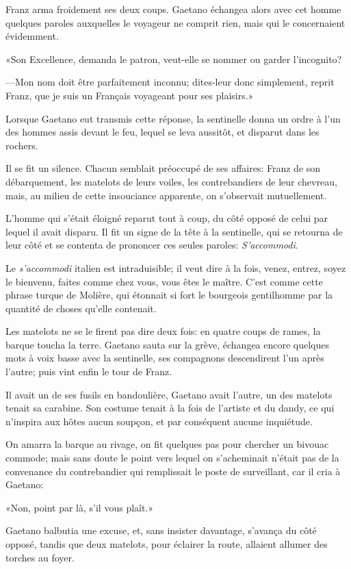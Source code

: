 Franz arma froidement ses deux coups. Gaetano échangea alors avec cet homme quelques paroles auxquelles le voyageur ne comprit rien, mais qui le concernaient évidemment.

«Son Excellence, demanda le patron, veut-elle se nommer ou garder l'incognito?

—Mon nom doit être parfaitement inconnu; dites-leur donc simplement, reprit Franz, que je suis un Français voyageant pour ses plaisirs.»

Lorsque Gaetano eut transmis cette réponse, la sentinelle donna un ordre à l'un des hommes assis devant le feu, lequel se leva aussitôt, et disparut dans les rochers.

Il se fit un silence. Chacun semblait préoccupé de ses affaires: Franz de son débarquement, les matelots de leurs voiles, les contrebandiers de leur chevreau, mais, au milieu de cette insouciance apparente, on s'observait mutuellement.

L'homme qui s'était éloigné reparut tout à coup, du côté opposé de celui par lequel il avait disparu. Il fit un signe de la tête à la sentinelle, qui se retourna de leur côté et se contenta de prononcer ces seules paroles: \textit{S'accommodi}.

Le \textit{s'accommodi} italien est intraduisible; il veut dire à la fois, venez, entrez, soyez le bienvenu, faites comme chez vous, vous êtes le maître. C'est comme cette phrase turque de Molière, qui étonnait si fort le bourgeois gentilhomme par la quantité de choses qu'elle contenait.

Les matelots ne se le firent pas dire deux fois: en quatre coups de rames, la barque toucha la terre. Gaetano sauta sur la grève, échangea encore quelques mots à voix basse avec la sentinelle, ses compagnons descendirent l'un après l'autre; puis vint enfin le tour de Franz.

Il avait un de ses fusils en bandoulière, Gaetano avait l'autre, un des matelots tenait sa carabine. Son costume tenait à la fois de l'artiste et du dandy, ce qui n'inspira aux hôtes aucun soupçon, et par conséquent aucune inquiétude.

On amarra la barque au rivage, on fit quelques pas pour chercher un bivouac commode; mais sans doute le point vers lequel on s'acheminait n'était pas de la convenance du contrebandier qui remplissait le poste de surveillant, car il cria à Gaetano:

«Non, point par là, s'il vous plaît.»

Gaetano balbutia une excuse, et, sans insister davantage, s'avança du côté opposé, tandis que deux matelots, pour éclairer la route, allaient allumer des torches au foyer.

